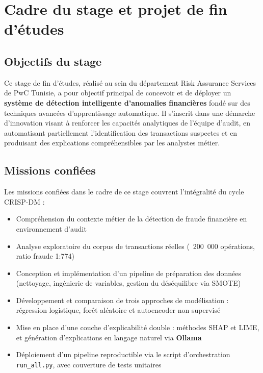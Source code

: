 \documentclass[12pt,a4paper,twoside]{report}
\begin{document}
\section{Cadre du stage et projet de fin d'études}

\subsection{Objectifs du stage}

Ce stage de fin d'études, réalisé au sein du département Risk Assurance Services de PwC Tunisie, a pour objectif principal de concevoir et de déployer un \textbf{système de détection intelligente d'anomalies financières} fondé sur des techniques avancées d'apprentissage automatique. Il s'inscrit dans une démarche d'innovation visant à renforcer les capacités analytiques de l'équipe d'audit, en automatisant partiellement l'identification des transactions suspectes et en produisant des explications compréhensibles par les analystes métier.

\subsection{Missions confiées}

Les missions confiées dans le cadre de ce stage couvrent l'intégralité du cycle CRISP-DM :

\begin{itemize}
  \item Compréhension du contexte métier de la détection de fraude financière en environnement d'audit
  \item Analyse exploratoire du corpus de transactions réelles (~200~000 opérations, ratio fraude 1:774)
  \item Conception et implémentation d'un pipeline de préparation des données (nettoyage, ingénierie de variables, gestion du déséquilibre via SMOTE)
  \item Développement et comparaison de trois approches de modélisation : régression logistique, forêt aléatoire et autoencoder non supervisé
  \item Mise en place d'une couche d'explicabilité double : méthodes SHAP et LIME, et génération d'explications en langage naturel via \textbf{Ollama}
  \item Déploiement d'un pipeline reproductible via le script d'orchestration \texttt{run\_all.py}, avec couverture de tests unitaires
\end{itemize}
\end{document}
